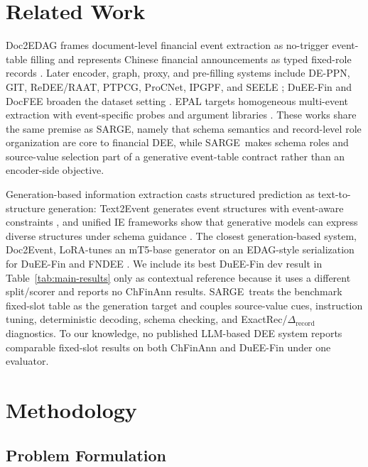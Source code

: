 \documentclass[runningheads]{llncs}
\newcommand{\method}{SARGE}
\begin{document}
\section{Related Work}
\label{sec:related}

Doc2EDAG frames document-level financial event extraction as no-trigger event-table filling and represents Chinese financial announcements as typed fixed-role records \cite{zheng2019doc2edag}. Later encoder, graph, proxy, and pre-filling systems include DE-PPN, GIT, ReDEE/RAAT, PTPCG, ProCNet, IPGPF, and SEELE \cite{huang2023ipgpf,liang2022raat,wang2023procnet,xu2021git,xu2024seele,yang2021deppn,zhu2022ptpcg}; DuEE-Fin and DocFEE broaden the dataset setting \cite{chen2025docfee,han2022dueefin}. EPAL targets homogeneous multi-event extraction with event-specific probes and argument libraries \cite{hu2025epal}. These works share the same premise as \method, namely that schema semantics and record-level role organization are core to financial DEE, while \method\ makes schema roles and source-value selection part of a generative event-table contract rather than an encoder-side objective.

Generation-based information extraction casts structured prediction as text-to-structure generation: Text2Event generates event structures with event-aware constraints \cite{lu2021text2event}, and unified IE frameworks show that generative models can express diverse structures under schema guidance \cite{hsu2022degree,lu2022uie}. The closest generation-based system, Doc2Event, LoRA-tunes an mT5-base generator on an EDAG-style serialization for DuEE-Fin and FNDEE \cite{ding2025doc2event}. We include its best DuEE-Fin dev result in Table~\ref{tab:main-results} only as contextual reference because it uses a different split/scorer and reports no ChFinAnn results. \method\ treats the benchmark fixed-slot table as the generation target and couples source-value cues, instruction tuning, deterministic decoding, schema checking, and ExactRec/$\Delta_{\mathrm{record}}$ diagnostics. To our knowledge, no published LLM-based DEE system reports comparable fixed-slot results on both ChFinAnn and DuEE-Fin under one evaluator.

\section{Methodology}
\label{sec:methodology}

\subsection{Problem Formulation}
\end{document}
